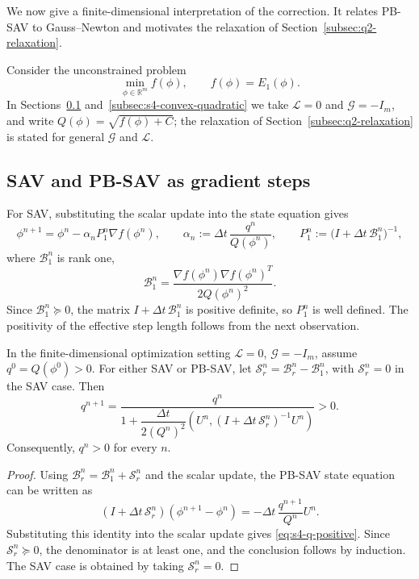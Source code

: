 \documentclass[10pt,onefignum,onetabnum,hidelinks]{siamart251216}
\begin{document}
We now give a finite-dimensional interpretation of the correction. It relates PB-SAV to Gauss--Newton and motivates the relaxation of Section~\ref{subsec:q2-relaxation}.

Consider the unconstrained problem
\[
\min_{\phi\in\mathbb R^m} f(\phi),
\qquad
f(\phi)=E_1(\phi).
\]
In Sections~\ref{subsec:s4-gradient-step} and~\ref{subsec:s4-convex-quadratic} we take $\mathcal L=0$ and $\mathcal G=-I_m$, and write $Q(\phi)=\sqrt{f(\phi)+C}$; the relaxation of Section~\ref{subsec:q2-relaxation} is stated for general $\mathcal G$ and $\mathcal L$.

\subsection{SAV and PB-SAV as gradient steps}
\label{subsec:s4-gradient-step}

For SAV, substituting the scalar update into the state equation gives
\begin{equation}
\phi^{n+1}
=
\phi^n-\alpha_n P_1^n \nabla f(\phi^n),
\qquad
\alpha_n:=\Delta t\,\frac{q^n}{Q(\phi^n)},
\qquad
P_1^n:=\bigl(I+\Delta t\,\mathcal B_1^n\bigr)^{-1},
\label{eq:s4-plain-iterate}
\end{equation}
where $\mathcal B_1^n$ is rank one,
\begin{equation}
\mathcal B_1^n=\frac{\nabla f(\phi^n)\nabla f(\phi^n)^T}{2Q(\phi^n)^2}.
\label{eq:s4-plain-rank-one-correction}
\end{equation}
Since $\mathcal B_1^n\succeq0$, the matrix
\(I+\Delta t\,\mathcal B_1^n\) is positive definite, so \(P_1^n\) is
well defined. The positivity of the effective step length follows from the
next observation.

\begin{proposition}
\label{prop:q-positivity}
In the finite-dimensional optimization setting
\(\mathcal L=0\), \(\mathcal G=-I_m\), assume
\(q^0=Q(\phi^0)>0\). For either SAV or PB-SAV, let
\(\mathcal S_r^n=\mathcal B_r^n-\mathcal B_1^n\), with
\(\mathcal S_r^n=0\) in the SAV case. Then
\begin{equation}
q^{n+1}
=
\frac{q^n}{
1+\dfrac{\Delta t}{2(Q^n)^2}
\left(
U^n,(I+\Delta t\,\mathcal S_r^n)^{-1}U^n
\right)}
>0.
\label{eq:s4-q-positive}
\end{equation}
Consequently, \(q^n>0\) for every \(n\).
\end{proposition}

\begin{proof}
Using
\(\mathcal B_r^n=\mathcal B_1^n+\mathcal S_r^n\) and the scalar update,
the PB-SAV state equation can be written as
\[
(I+\Delta t\,\mathcal S_r^n)(\phi^{n+1}-\phi^n)
=
-\Delta t\,\frac{q^{n+1}}{Q^n}U^n.
\]
Substituting this identity into the scalar update gives
\eqref{eq:s4-q-positive}. Since
\(\mathcal S_r^n\succeq0\), the denominator is at least one, and the
conclusion follows by induction. The SAV case is obtained by taking
\(\mathcal S_r^n=0\).
\end{proof}
\end{document}
